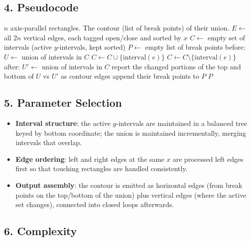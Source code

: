 \subsection{4. Pseudocode}

\begin{algorithm}[htbp]
\caption{Union Contour of Axis-Parallel Rectangles}
\label{alg:union_rectangles}
\begin{algorithmic}[1]
\Require $n$ axis-parallel rectangles.
\Ensure The contour (list of break points) of their union.
  \State $E \gets$ all $2n$ vertical edges, each tagged open/close and sorted by $x$
  \State $C \gets$ empty set of intervals (active $y$-intervals, kept sorted)
  \State $P \gets$ empty list of break points
    \State before: $U \gets$ union of intervals in $C$
     \State $C \gets C \cup \{\text{interval}(e)\}$
    \Else \State $C \gets C \setminus \{\text{interval}(e)\}$ \EndIf
    \State after: $U' \gets$ union of intervals in $C$
    \State report the changed portions of the top and bottom of $U$ vs $U'$ as contour edges
    \State append their break points to $P$
  \EndFor
  \State \Return $P$
\EndFunction
\end{algorithmic}
\end{algorithm}

\subsection{5. Parameter Selection}

\begin{itemize}
\item \textbf{Interval structure}: the active $y$-intervals are maintained
  in a balanced tree keyed by bottom coordinate; the union is maintained
  incrementally, merging intervals that overlap.
\item \textbf{Edge ordering}: left and right edges at the same $x$ are
  processed left edges first so that touching rectangles are handled
  consistently.
\item \textbf{Output assembly}: the contour is emitted as horizontal edges
  (from break points on the top/bottom of the union) plus vertical edges
  (where the active set changes), connected into closed loops afterwards.
\end{itemize}

\subsection{6. Complexity}

